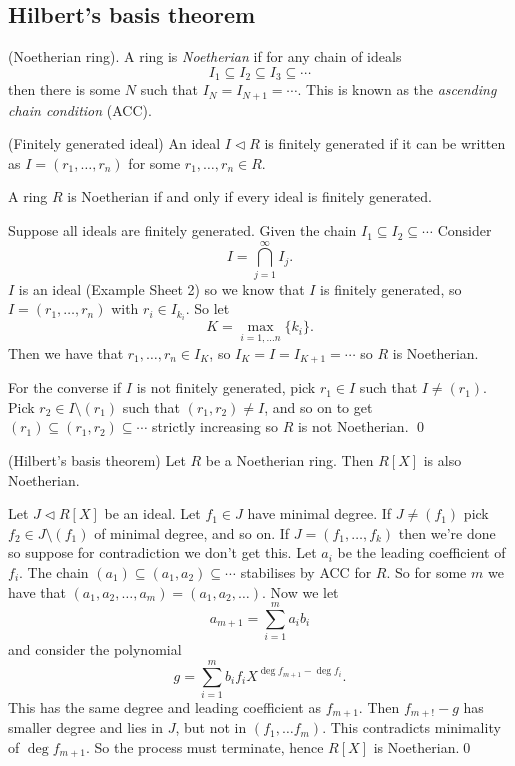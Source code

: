 \documentclass{article}
\newcommand{\nrm}{\triangleleft}
\begin{document}
\subsection{Hilbert's basis theorem}
\begin{definition}
	(Noetherian ring). A ring is \textit{Noetherian} if for any chain of ideals
	\[
	  I_1\subseteq I_2\subseteq I_3\subseteq \cdots
	\]
	then there is some $ N $ such that $ I_N=I_{N+1}=\cdots $. This is known as the \textit{ascending chain condition} (ACC).
\end{definition}
\begin{definition}
	(Finitely generated ideal) An ideal $ I\nrm R $ is finitely generated if it can be written as $ I=(r_1,\dots, r_n) $ for some $ r_1,\dots, r_n\in R $.
\end{definition}
\begin{proposition}
  A ring $ R $ is Noetherian if and only if every ideal is finitely generated.
\end{proposition}
\pf Suppose all ideals are finitely generated. Given the chain $ I_1\subseteq I_2\subseteq \cdots $ Consider
\[
	I=\bigcap_{j=1}^\infty I_j.
\]
$ I $ is an ideal (Example Sheet 2) so we know that $ I $ is finitely generated, so $ I=(r_1,\dots,r_n) $ with $ r_i\in I_{k_i} $. So let
\[
	K=\max_{i=1,\dots n}\{k_i\}.
\]
Then we have that $ r_1,\dots,r_n\in I_K $, so $ I_K=I=I_{K+1}=\cdots $ so $ R $ is Noetherian.\par
For the converse if $ I $ is not finitely generated, pick $ r_1\in I $ such that $ I\ne (r_1) $. Pick $ r_2\in I\setminus (r_1) $ such that $ (r_1,r_2)\ne I $, and so on to get $ (r_1)\subseteq (r_1,r_2)\subseteq \cdots $ strictly increasing so $ R $ is not Noetherian. \qed
\begin{theorem}
	(Hilbert's basis theorem) Let $ R $ be a Noetherian ring. Then $ R[X] $ is also Noetherian.
\end{theorem}
\pf Let $ J\nrm R[X] $ be an ideal. Let $ f_1\in J $ have minimal degree. If $ J \ne (f_1) $ pick $ f_2\in J\setminus (f_1) $ of minimal degree, and so on. If $ J=(f_1,\dots, f_k) $ then we're done so suppose for contradiction we don't get this. Let $ a_i $ be the leading coefficient of $ f_i $. The chain $ (a_1)\subseteq (a_1,a_2)\subseteq \cdots $ stabilises by ACC for $ R $. So for some $ m $ we have that $ (a_1,a_2,\dots, a_m)=(a_1,a_2,\dots) $. Now we let
\[
	a_{m+1}=\sum_{i=1}^ma_ib_i
\]
and consider the polynomial
\[
	g=\sum_{i=1}^mb_if_iX^{\deg f_{m+1}-\deg f_i}.
\]
This has the same degree and leading coefficient as $ f_{m+1} $. Then $ f_{m+!}-g $ has smaller degree and lies in $ J $, but not in $ (f_1,\dots f_m) $. This contradicts minimality of $ \deg f_{m+1} $. So the process must terminate, hence $ R[X] $ is Noetherian.\qed
\end{document}
